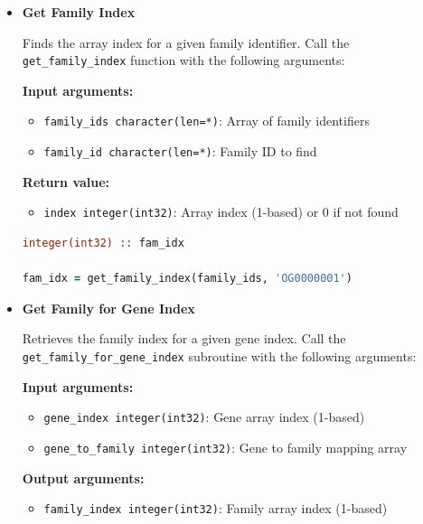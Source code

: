 \documentclass[11pt]{article}
\begin{document}
\begin{enumerate}
\begin{itemize}
\begin{lstlisting}[language=Fortran, caption={Find Gene Index}]
gene_idx = get_gene_index(gene_ids, 'NP_001000001.1')
if (gene_idx > 0) then
    ! Gene found at position gene_idx
else
    ! Gene not found
end if
	      	      \end{lstlisting}
	      	      
	      	\item \textbf{Get Family Index}
	      	      
	      	      Finds the array index for a given family identifier. Call the \texttt{get\_family\_index}
	      	      function with the following arguments:
	      	      
	      	      \textbf{Input arguments:}
	      	      \begin{itemize}
	      	      	\item \texttt{family\_ids character(len=*)}: Array of family identifiers
	      	      	      
	      	      	\item \texttt{family\_id character(len=*)}: Family ID to find
	      	      \end{itemize}
	      	      \textbf{Return value:}
	      	      \begin{itemize}
	      	      	\item \texttt{index integer(int32)}: Array index (1-based) or 0 if not
	      	      	      found
	      	      \end{itemize}
	      	      \begin{lstlisting}[language=Fortran, caption={Find Family Index}]
integer(int32) :: fam_idx

fam_idx = get_family_index(family_ids, 'OG0000001')
	      	      \end{lstlisting}
	      	      
	      	\item \textbf{Get Family for Gene Index}
	      	      
	      	      Retrieves the family index for a given gene index. Call the \texttt{get\_family\_for\_gene\_index}
	      	      subroutine with the following arguments:
	      	      
	      	      \textbf{Input arguments:}
	      	      \begin{itemize}
	      	      	\item \texttt{gene\_index integer(int32)}: Gene array index (1-based)
	      	      	      
	      	      	\item \texttt{gene\_to\_family integer(int32)}: Gene to family mapping
	      	      	      array
	      	      \end{itemize}
	      	      \textbf{Output arguments:}
	      	      \begin{itemize}
	      	      	\item \texttt{family\_index integer(int32)}: Family array index (1-based)
	      	      	      

\end{itemize}
\end{itemize}
\end{enumerate}
\end{document}
